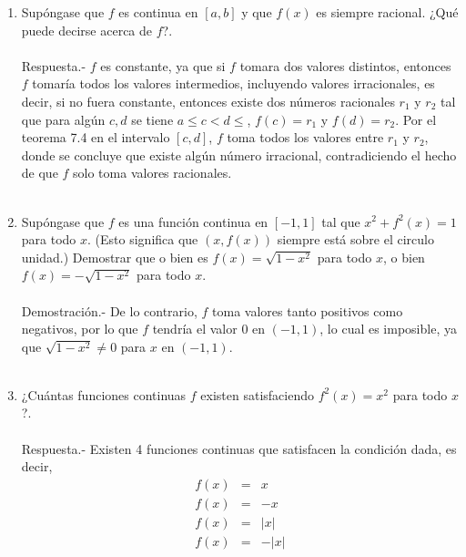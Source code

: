 \begin{enumerate}[\bfseries 1.]
\begin{enumerate}[\bfseries (a)]
    \end{enumerate}

\item Supóngase que $f$ es continua en $[a,b]$ y que $f(x)$ es siempre racional. ¿Qué puede decirse acerca de $f$?.\\\\
    Respuesta.-\; $f$ es constante, ya que si $f$ tomara dos valores distintos, entonces $f$ tomaría todos los valores intermedios, incluyendo valores irracionales, es decir, si no fuera constante, entonces existe dos números racionales $r_1$ y $r_2$ tal que para algún $c,d$ se tiene $a\leq c<d\leq$, $f(c)=r_1$ y $f(d) = r_2$. Por el teorema 7.4 en el intervalo $[c,d]$, $f$ toma todos los valores entre $r_1$ y $r_2$, donde se concluye que existe algún número irracional, contradiciendo el hecho de que $f$ solo toma valores racionales.\\\\

\item Supóngase que $f$ es una función continua en $[-1,1]$ tal que $x^2+f^2(x) = 1$ para todo $x$. (Esto significa que $(x,f(x))$ siempre está sobre el circulo unidad.) Demostrar que o bien es $f(x)=\sqrt{1-x^2}$ para todo $x$, o bien $f(x)=-\sqrt{1-x^2}$ para todo $x$.\\\\
    Demostración.-\; De lo contrario, $f$ toma valores tanto positivos como negativos, por lo que $f$ tendría el valor $0$ en  $(-1, 1)$, lo cual es imposible, ya que $\sqrt{1-x^2} \neq 0$ para $x$ en $(-1,1)$.\\\\ 
 

\item ¿Cuántas funciones continuas $f$ existen satisfaciendo $f^2(x)=x^2$ para todo $x$?.\\\\
    Respuesta.-\; Existen 4 funciones continuas que satisfacen la condición dada, es decir,
    $$\begin{array}{rcl}
	f(x)&=&x\\
	f(x)&=&-x\\
	f(x)&=&|x|\\
	f(x)&=&-|x|\\\\
    \end{array}$$


\end{enumerate}
